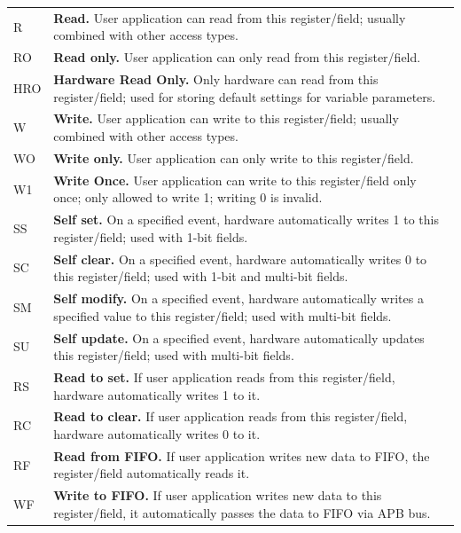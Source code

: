 \begin{longtable}[c]{ R{1cm} p{13cm} }

R & \textbf{Read.} 
	User application can read from this register/field; usually combined with other access types. \\
RO & \textbf{Read only.} 
	User application can only read from this register/field. \\
HRO & \textbf{Hardware Read Only.} 
	Only hardware can read from this register/field; used for storing default settings for variable parameters. \\
W & \textbf{Write.} 
	User application can write to this register/field; usually combined with other access types. \\
WO & \textbf{Write only.} 
	User application can only write to this register/field. \\
W1 & \textbf{Write Once.}
	User application can write to this register/field only once; only allowed to write 1; writing 0 is invalid. \\

SS & \textbf{Self set.} 
	On a specified event, hardware automatically writes 1 to this register/field; used with 1-bit fields. \\
SC & \textbf{Self clear.} 
	On a specified event, hardware automatically writes 0 to this register/field; used with 1-bit and multi-bit fields. \\
SM & \textbf{Self modify.} 
	On a specified event, hardware automatically writes a specified value to this register/field; used with multi-bit fields. \\
SU & \textbf{Self update.} 
	On a specified event, hardware automatically updates this register/field; used with multi-bit fields. \\

RS & \textbf{Read to set.} 
	If user application reads from this register/field, hardware automatically writes 1 to it. \\
RC & \textbf{Read to clear.} 
	If user application reads from this register/field, hardware automatically writes 0 to it. \\
RF & \textbf{Read from FIFO.} 
	If user application writes new data to FIFO, the register/field automatically reads it. \\

WF & \textbf{Write to FIFO.} 
	If user application writes new data to this register/field, it automatically passes the data to FIFO via APB bus. \\


\end{longtable}
